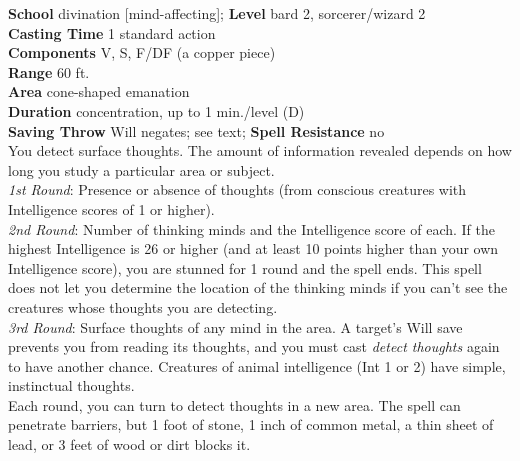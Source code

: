 \textbf{School} divination [mind-affecting]; \textbf{Level} bard 2, sorcerer/wizard 2\\
\textbf{Casting Time} 1 standard action\\
\textbf{Components} V, S, F/DF (a copper piece)\\
\textbf{Range} 60 ft.\\
\textbf{Area} cone-shaped emanation\\
\textbf{Duration} concentration, up to 1 min./level (D)\\
\textbf{Saving Throw }Will negates; see text; \textbf{Spell Resistance} no\\
You detect surface thoughts. The amount of information revealed depends on how long you study a particular area or subject.\\
\textit{1st Round}: Presence or absence of thoughts (from conscious creatures with Intelligence scores of 1 or higher).\\
\textit{2nd Round}: Number of thinking minds and the Intelligence score of each. If the highest Intelligence is 26 or higher (and at least 10 points higher than your own Intelligence score), you are stunned for 1 round and the spell ends. This spell does not let you determine the location of the thinking minds if you can't see the creatures whose thoughts you are detecting.\\
\textit{3rd Round}: Surface thoughts of any mind in the area. A target's Will save prevents you from reading its thoughts, and you must cast \textit{detect thoughts }again to have another chance. Creatures of animal intelligence (Int 1 or 2) have simple, instinctual thoughts.\\
Each round, you can turn to detect thoughts in a new area. The spell can penetrate barriers, but 1 foot of stone, 1 inch of common metal, a thin sheet of lead, or 3 feet of wood or dirt blocks it.\\
